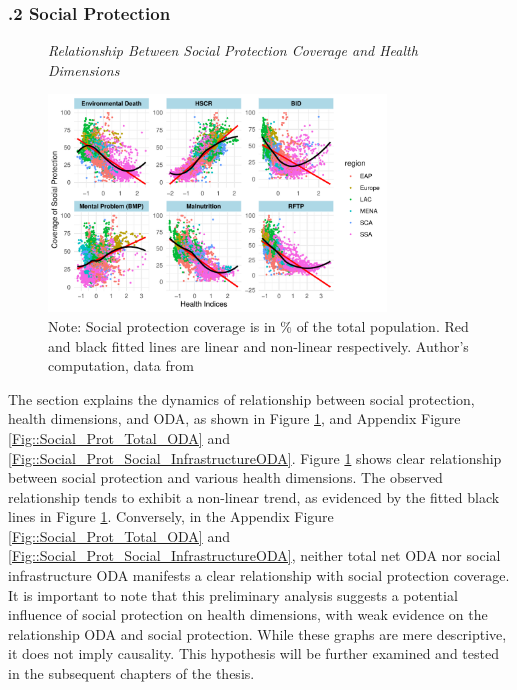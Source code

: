 \subsubsection*{.2  Social Protection}
\begin{figure}[ht]
\caption{\textit{Relationship Between Social Protection Coverage and Health Dimensions}}
    \centering \includegraphics[width = 0.8\textwidth]{Figures/ODA_against_Hth/SocProct_Hlth_plt.pdf}
    \caption*{\footnotesize Note: Social protection coverage is in \% of the total population. Red and black fitted lines are linear and non-linear respectively. Author's computation, data from \textcite{unsdg_sustainable_2023, wdi_world_2023}}
    \label{Fig::SocailProtection and Health}
\end{figure}

The section explains the dynamics of relationship between social protection, health dimensions, and ODA, as shown in Figure \ref{Fig::SocailProtection and Health}, and Appendix Figure \ref{Fig::Social_Prot_Total_ODA} and \ref{Fig::Social_Prot_Social_InfrastructureODA}. Figure \ref{Fig::SocailProtection and Health} shows clear relationship between social protection and various health dimensions. The observed relationship tends to exhibit a non-linear trend, as evidenced by the fitted black lines in Figure \ref{Fig::SocailProtection and Health}. Conversely, in the Appendix Figure \ref{Fig::Social_Prot_Total_ODA} and \ref{Fig::Social_Prot_Social_InfrastructureODA}, neither total net ODA nor social infrastructure ODA  manifests a clear relationship with social protection coverage. It is important to note that this preliminary analysis suggests a potential influence of social protection on health dimensions, with weak evidence on the relationship ODA and social protection. While these graphs are mere descriptive, it does not imply causality. This hypothesis will be further examined and tested  in the subsequent chapters of the thesis.



